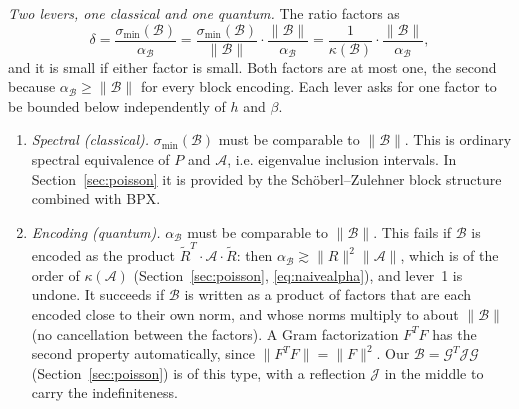 \documentclass[11pt,a4paper]{article}
\newcommand{\A}{\mathcal{A}}
\newcommand{\B}{\mathcal{B}}
\newcommand{\G}{\mathcal{G}}
\newcommand{\J}{\mathcal{J}}
\newcommand{\Rt}{\widetilde R}
\theoremstyle{remark}
\begin{document}
\emph{Two levers, one classical and one quantum.} The ratio factors as
\[
\delta=\frac{\sigma_{\min}(\B)}{\alpha_\B}=\frac{\sigma_{\min}(\B)}{\|\B\|}\cdot\frac{\|\B\|}{\alpha_\B}
=\frac1{\kappa(\B)}\cdot\frac{\|\B\|}{\alpha_\B},
\]
and it is small if either factor is small. Both factors are at most one, the
second because $\alpha_\B\ge\|\B\|$ for every block encoding. Each lever asks for
one factor to be bounded below independently of $h$ and $\beta$.
\begin{enumerate}
\item \emph{Spectral (classical).} $\sigma_{\min}(\B)$ must be comparable to $\|\B\|$.
  This is ordinary spectral equivalence of $P$ and $\A$, i.e. eigenvalue
  inclusion intervals. In Section~\ref{sec:poisson} it is provided by the
  Sch\"oberl--Zulehner block structure combined with BPX.
\item \emph{Encoding (quantum).} $\alpha_\B$ must be comparable to $\|\B\|$. This
  fails if $\B$ is encoded as the product $\Rt^T\cdot\A\cdot\Rt$: then
  $\alpha_\B\gtrsim\|R\|^2\|\A\|$, which is of the order of $\kappa(\A)$ (Section~\ref{sec:poisson},
  \eqref{eq:naivealpha}), and lever~1 is undone. It succeeds if $\B$ is
  written as a product of factors that are each encoded close to their own
  norm, and whose norms multiply to about $\|\B\|$ (no cancellation between
  the factors). A Gram factorization $F^TF$ has the second property
  automatically, since $\|F^TF\|=\|F\|^2$. Our $\B=\G^T\J\G$ (Section~\ref{sec:poisson}) is
  of this type, with a reflection $\J$ in the middle to carry the
  indefiniteness.
\end{enumerate}
\end{document}
